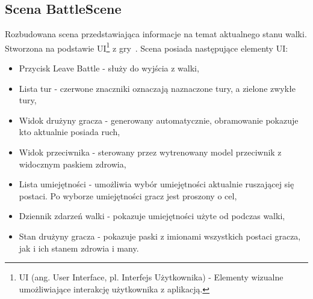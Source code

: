 \documentclass{SGGW-thesis}
\begin{document}
\subsection{Scena BattleScene}
Rozbudowana scena przedstawiająca informacje na temat aktualnego stanu walki. Stworzona na podstawie UI\footnote{UI (ang. User Interface, pl. Interfejs Użytkownika) - Elementy wizualne umożliwiające interakcję użytkownika z aplikacją.} z gry~\cite{SMT3}.
Scena posiada następujące elementy UI:
\begin{itemize}
  \item{Przycisk Leave Battle - służy do wyjścia z walki},
  \item{Lista tur - czerwone znaczniki oznaczają naznaczone tury, a zielone zwykłe tury},
  \item{Widok drużyny gracza - generowany automatycznie, obramowanie pokazuje kto aktualnie posiada ruch},
  \item{Widok przeciwnika - sterowany przez wytrenowany model przeciwnik z widocznym paskiem zdrowia},
  \item{Lista umiejętności - umożliwia wybór umiejętności aktualnie ruszającej się postaci. Po wyborze umiejętności gracz jest proszony o cel},
  \item{Dziennik zdarzeń walki - pokazuje umiejętności użyte od podczas walki},
  \item{Stan drużyny gracza - pokazuje paski z imionami wszystkich postaci gracza, jak i ich stanem zdrowia i many}.
\end{itemize}
\end{document}
